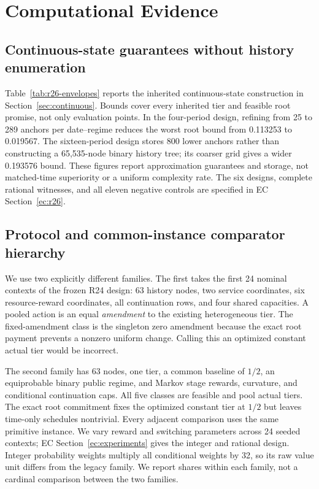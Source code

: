 \section{Computational Evidence}\label{sec:evidence}

\subsection{Continuous-state guarantees without history enumeration}
Table~\ref{tab:r26-envelopes} reports the inherited continuous-state construction in Section~\ref{sec:continuous}. Bounds cover every inherited tier and feasible root promise, not only evaluation points. In the four-period design, refining from 25 to 289 anchors per date--regime reduces the worst root bound from 0.113253 to 0.019567. The sixteen-period design stores 800 lower anchors rather than constructing a 65,535-node binary history tree; its coarser grid gives a wider 0.193576 bound. These figures report approximation guarantees and storage, not matched-time superiority or a uniform complexity rate. The six designs, complete rational witnesses, and all eleven negative controls are specified in EC Section~\ref{ec:r26}.


\subsection{Protocol and common-instance comparator hierarchy}
We use two explicitly different families. The first takes the first 24 nominal contexts of the frozen R24 design: 63 history nodes, two service coordinates, six resource-reward coordinates, all continuation rows, and four shared capacities. A pooled action is an equal \emph{amendment} to the existing heterogeneous tier. The fixed-amendment class is the singleton zero amendment because the exact root payment prevents a nonzero uniform change. Calling this an optimized constant actual tier would be incorrect.

The second family has 63 nodes, one tier, a common baseline of $1/2$, an equiprobable binary public regime, and Markov stage rewards, curvature, and conditional continuation caps. All five classes are feasible and pool actual tiers. The exact root commitment fixes the optimized constant tier at $1/2$ but leaves time-only schedules nontrivial. Every adjacent comparison uses the same primitive instance. We vary reward and switching parameters across 24 seeded contexts; EC Section~\ref{ec:experiments} gives the integer and rational design. Integer probability weights multiply all conditional weights by 32, so its raw value unit differs from the legacy family. We report shares within each family, not a cardinal comparison between the two families.

